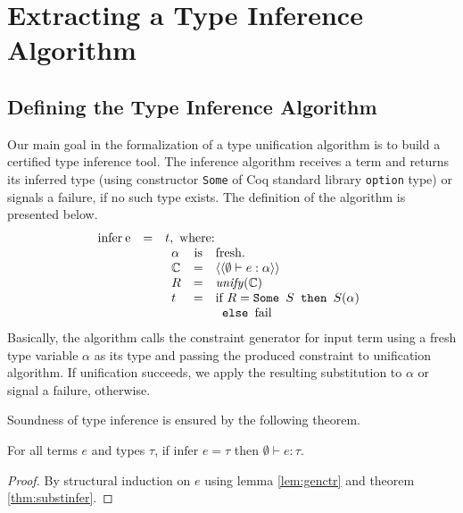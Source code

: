 \section{Extracting a Type Inference Algorithm}\label{evaluation}

\subsection{Defining the Type Inference Algorithm}

Our main goal in the formalization of a type unification algorithm is
to build a certified type inference tool. The inference algorithm
receives a term and returns its inferred type (using constructor
\lstinline|Some| of Coq standard library \lstinline|option| type) or
signals a failure, if no such type exists. The definition of the
algorithm is presented below.
\[
   \begin{array}{lcl}
      \text{infer}\:\text{e} & = & t, \text{ where:}\\
       & & \begin{array}{lcl}
              \alpha     & \text{is}  & \text{fresh.} \\
              \mathbb{C} & = & \langle\langle \emptyset \vdash e : \alpha \rangle\rangle\\
              R          & = & \text{\it unify\/}(\mathbb{C}) \\
              t          & = & \text{if }R = \texttt{Some }S \texttt{ then } S(\alpha) \\
                         &   & \texttt{ else } \text{fail}
           \end{array}
   \end{array}
\]
Basically, the algorithm calls the constraint generator for input term using a
fresh type variable $\alpha$ as its type and passing the produced constraint
to unification algorithm. If unification succeeds, we apply the resulting
substitution to $\alpha$ or signal a failure, otherwise.

Soundness of type inference is ensured by the following theorem.

\begin{Theorem}
   For all terms $e$ and types $\tau$, if $\text{infer }e = \tau$ then
   $\emptyset \vdash e : \tau$.
\end{Theorem}
\begin{proof}
   By structural induction on $e$ using lemma \ref{lem:genctr} and
   theorem \ref{thm:substinfer}.
\end{proof}

